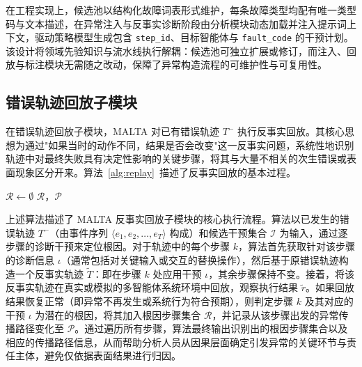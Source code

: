 在工程实现上，候选池以结构化故障词表形式维护，每条故障类型均配有唯一类型码与文本描述，在异常注入与反事实诊断阶段由分析模块动态加载并注入提示词上下文，驱动策略模型生成包含 \texttt{step\_id}、目标智能体与 \texttt{fault\_code} 的干预计划。该设计将领域先验知识与流水线执行解耦：候选池可独立扩展或修订，而注入、回放与标注模块无需随之改动，保障了异常构造流程的可维护性与可复用性。

\subsection{错误轨迹回放子模块}

在错误轨迹回放子模块，MALTA 对已有错误轨迹 $T^-$ 执行反事实回放。其核心思想为通过"如果当时的动作不同，结果是否会改变"这一反事实问题，系统性地识别轨迹中对最终失败具有决定性影响的关键步骤，将其与大量不相关的次生错误或表面现象区分开来。算法~\ref{alg:replay}~描述了反事实回放的基本过程。

\vspace{5mm}
\begin{algorithm}[H]
  \caption{反事实回放算法}
  \label{alg:replay}
  $\mathcal{R} \leftarrow \emptyset$\;
  \Return $\mathcal{R}$，$\mathcal{P}$\;
\end{algorithm}

\vspace{5mm}
上述算法描述了 MALTA 反事实回放子模块的核心执行流程。算法以已发生的错误轨迹 $T^-$（由事件序列 $\langle e_1, e_2, \ldots, e_T \rangle$ 构成）和候选干预集合 $\mathcal{I}$ 为输入，通过逐步骤的诊断干预来定位根因。对于轨迹中的每个步骤 $k$，算法首先获取针对该步骤的诊断信息 $\iota$（通常包括对关键输入或交互的替换操作），然后基于原错误轨迹构造一个反事实轨迹 $\tilde{T}$：即在步骤 $k$ 处应用干预 $\iota$，其余步骤保持不变。接着，将该反事实轨迹在真实或模拟的多智能体系统环境中回放，观察执行结果 $\tilde{r}$。如果回放结果恢复正常（即异常不再发生或系统行为符合预期），则判定步骤 $k$ 及其对应的干预 $\iota$ 为潜在的根因，将其加入根因步骤集合 $\mathcal{R}$，并记录从该步骤出发的异常传播路径变化至 $\mathcal{P}$。通过遍历所有步骤，算法最终输出识别出的根因步骤集合以及相应的传播路径信息，从而帮助分析人员从因果层面确定引发异常的关键环节与责任主体，避免仅依据表面结果进行归因。
 
